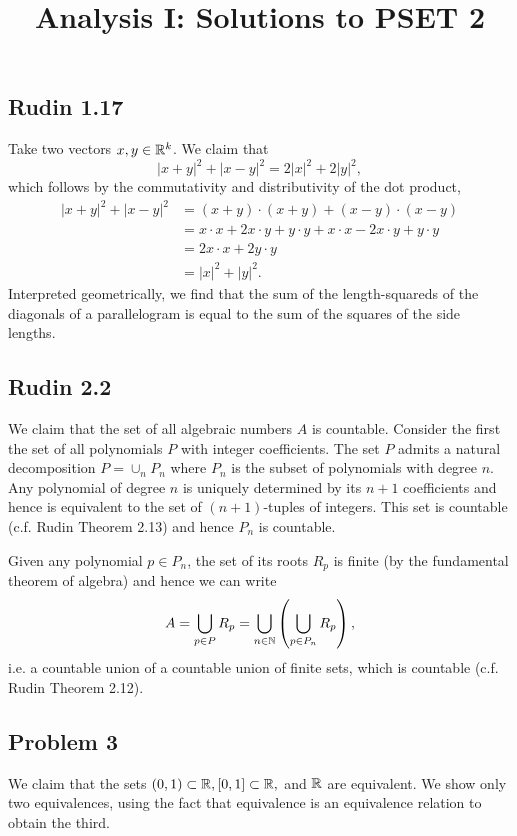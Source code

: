\documentclass{../mathnotes}
\title{Analysis I: Solutions to PSET 2}
\author{}
\date{}
\begin{document}
\maketitle

\subsection*{Rudin 1.17}
Take two vectors $x,y\in\mathbb{R}^k$. We claim that
\[|x+y|^2+|x-y|^2=2|x|^2+2|y|^2,\]
which follows by the commutativity and distributivity of the dot product,
\begin{align*}
    |x+y|^2+|x-y|^2 &= (x+y)\cdot(x+y) + (x-y)\cdot (x-y)\\
    &= x\cdot x+2x\cdot y+y\cdot y+x\cdot x-2x\cdot y+y\cdot y\\
    &= 2x\cdot x+2y\cdot y\\
    &=|x|^2+|y|^2.
\end{align*}
Interpreted geometrically, we find that the sum of the length-squareds
of the diagonals of a parallelogram is equal to the sum of the squares of the side lengths.

\subsection*{Rudin 2.2}
We claim that the set of all algebraic numbers $A$ is countable. Consider the first the set
of all polynomials $P$ with integer coefficients. The set $P$ admits a natural decomposition
$P=\cup_n P_n$ where $P_n$ is the subset of polynomials with degree $n$.
Any polynomial of degree $n$ is uniquely determined by its $n+1$ coefficients and hence is
equivalent to the set of $(n+1)$-tuples of integers.
This set is countable (c.f. Rudin Theorem 2.13) and hence $P_n$ is countable.

Given any polynomial $p\in P_n$, the set of its roots $R_p$ is finite (by the fundamental theorem of algebra)
and hence we can write
\[A=\bigcup_{p\in P}R_p=\bigcup_{n\in\mathbb{N}}\left(\bigcup_{p\in P_n}R_p\right),\]
i.e. a countable union of a countable union of finite sets, which is countable (c.f. Rudin Theorem 2.12).

\subsection*{Problem 3}
We claim that the sets $(0,1)\subset\mathbb{R},[0,1]\subset\mathbb{R},$ and $\mathbb{R}$ are equivalent. We show only two equivalences,
using the fact that equivalence is an equivalence relation to obtain the third.
\end{document}
